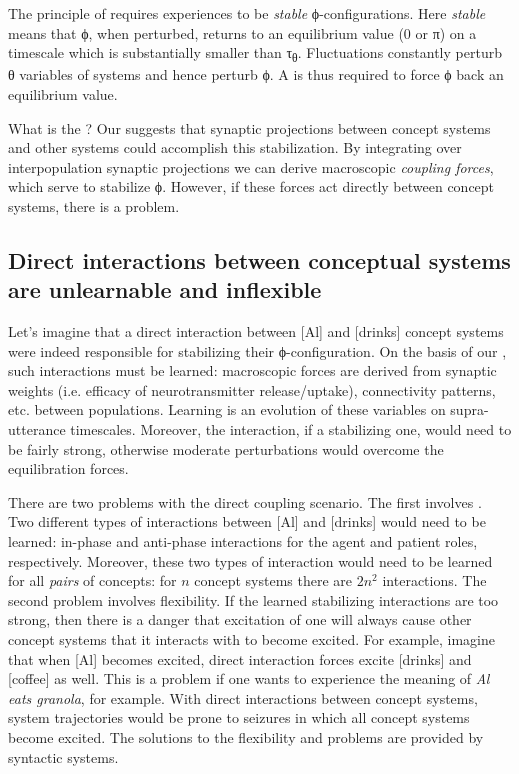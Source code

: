   The principle of  requires  experiences to be \textit{stable} ϕ-configurations. Here \textit{stable} means that ϕ, when perturbed, returns to an equilibrium value (0 or π) on a timescale which is substantially smaller than τ\textsubscript{θ}. Fluctuations constantly perturb θ variables of systems and hence perturb ϕ. A  is thus required to force ϕ back an equilibrium value. 

  What is the ? Our  suggests that synaptic projections between concept systems and other systems could accomplish this stabilization. By integrating over interpopulation synaptic projections we can derive macroscopic \textit{coupling forces}, which serve to stabilize ϕ. However, if these forces act directly between concept systems, there is a problem.

\subsection{Direct interactions between conceptual systems are unlearnable and inflexible} 

Let's imagine that a direct interaction between [Al] and [drinks] concept systems were indeed responsible for stabilizing their ϕ-configuration. On the basis of our , such interactions must be learned: macroscopic forces are derived from synaptic weights (i.e. efficacy of neurotransmitter release/uptake), connectivity patterns, etc. between populations. Learning is an evolution of these variables on supra-utterance timescales. Moreover, the interaction, if a stabilizing one, would need to be fairly strong, otherwise moderate perturbations would overcome the equilibration forces. 

  There are two problems with the direct coupling scenario. The first involves . Two different types of interactions between [Al] and [drinks] would need to be learned: in-phase and anti-phase interactions for the agent and patient roles, respectively. Moreover, these two types of interaction would need to be learned for all \textit{pairs} of concepts: for $n$ concept systems there are $2n^2$ interactions. The second problem involves flexibility. If the learned stabilizing interactions are too strong, then there is a danger that excitation of one  will always cause other concept systems that it interacts with to become excited. For example, imagine that when [Al] becomes excited, direct interaction forces excite [drinks] and [coffee] as well. This is a problem if one wants to experience the meaning of \textit{Al eats granola}, for example. With direct interactions between concept systems, system trajectories would be prone to seizures in which all concept systems become excited. The solutions to the flexibility and  problems are provided by syntactic systems.

